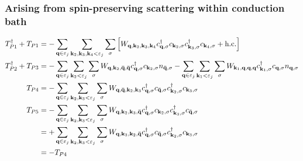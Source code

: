 \documentclass[reprint,hidelinks]{revtex4-2}
\begin{document}
\begin{widetext}
\subsubsection*{Arising from spin-preserving scattering within conduction bath}
\begin{equation}\begin{aligned}
	T_{P1}^\dagger + T_{P1} &= -\sum_{{\bf q} \in \varepsilon_j}\sum_{{\bf k}_2, {\bf k}_3, {\bf k}_4 < \varepsilon_j}\sum_{\sigma} \left[W_{{\bf q},{\bf k}_2,{\bf k}_3,{\bf k}_4}c^\dagger_{{\bf q},\sigma}c_{{\bf k}_2,\sigma}c^\dagger_{{\bf k}_3,\sigma}c_{{\bf k}_4,\sigma} + \text{h.c.}\right]\\
	T_{P2}^\dagger + T_{P3} &= -\sum_{{\bf q} \in \varepsilon_j}\sum_{{\bf k}_2 < \varepsilon_j}\sum_{\sigma} W_{{\bf q},{\bf k}_2,{\bf \bar q}, {\bf \bar q}} c^\dagger_{{\bf q},\sigma}c_{{\bf k}_2,\sigma} n_{{\bf \bar q},\sigma} -\sum_{{\bf q} \in \varepsilon_j}\sum_{{\bf k}_1 < \varepsilon_j}\sum_{\sigma} W_{{\bf k}_1,{\bf q},{\bf q},{\bf q}} c^\dagger_{{\bf k}_1,\sigma}c_{{\bf q},\sigma} n_{{\bf q},\sigma}\\
	T_{P4} &= -\sum_{{\bf q} \in \varepsilon_j}\sum_{{\bf k}_2, {\bf k}_3 < \varepsilon_j}\sum_{\sigma}W_{{\bf q},{\bf \bar q},{\bf k}_2,{\bf k}_3} c^\dagger_{{\bf q},\sigma}c_{{\bf \bar q},\sigma}c^\dagger_{{\bf k}_2,\sigma}c_{{\bf k}_3,\sigma}\\
	T_{P5} &= -\sum_{{\bf q} \in \varepsilon_j}\sum_{{\bf k}_2, {\bf k}_3 < \varepsilon_j}\sum_{\sigma} W_{{\bf q},{\bf k}_2,{\bf k}_3,{\bf \bar q}} c^\dagger_{{\bf q},\sigma}c_{{\bf k}_2,\sigma}c^\dagger_{{\bf k}_3,\sigma}c_{{\bf \bar q},\sigma}\\
		   &= +\sum_{{\bf q} \in \varepsilon_j}\sum_{{\bf k}_2, {\bf k}_3 < \varepsilon_j}\sum_{\sigma} W_{{\bf q},{\bf k}_3,{\bf k}_2,{\bf \bar q}} c^\dagger_{{\bf q},\sigma}c_{{\bf \bar q},\sigma}c^\dagger_{{\bf k}_2,\sigma}c_{{\bf k}_3,\sigma}\\
		   &= -T_{P4}
\end{aligned}\end{equation}

\end{widetext}
\end{document}
